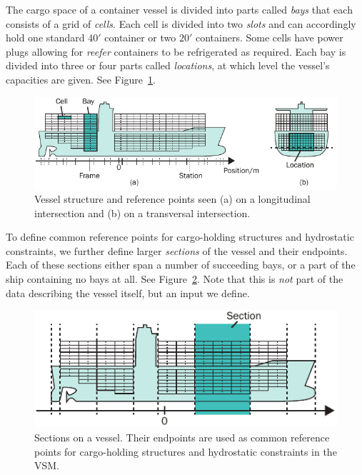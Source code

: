 The cargo space of a container vessel is divided into parts called \textit{bays} that each consists of a grid of \emph{cells}. Each cell is divided into two \emph{slots} and can accordingly hold one standard $40'$ container or two $20'$ containers. Some cells have power plugs allowing for \emph{reefer} containers to be refrigerated as required. Each bay is divided into three or four parts called \textit{locations}, at which level the vessel's capacities are given. See Figure~\ref{fig:vessel}.

\begin{figure}[htbp]
	\centering
		\includegraphics{figures/vessel3.pdf}
	\caption{Vessel structure and reference points seen (a) on a longitudinal intersection and (b) on a transversal intersection.}
	\label{fig:vessel}
\end{figure}

To define common reference points for cargo-holding structures and hydrostatic constraints, we further define larger \emph{sections} of the vessel and their endpoints. Each of these sections either span a number of succeeding bays, or a part of the ship containing no bays at all.
See Figure~\ref{fig:sectionEndPoints}. Note that this is \emph{not} part of the data describing the vessel itself, but an input we define.

\begin{figure}[htbp]
	\centering
		\includegraphics{figures/sectionEndPoints.pdf}
	\caption{Sections on a vessel. Their endpoints are used as common reference points for cargo-holding structures and hydrostatic constraints in the VSM.}
	\label{fig:sectionEndPoints}
\end{figure}

